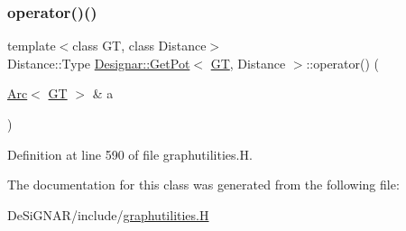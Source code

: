 \subsubsection{\texorpdfstring{operator()()}{operator()()}}
{\footnotesize\ttfamily template$<$class GT, class Distance$>$ \\
Distance\+::\+Type \hyperlink{class_designar_1_1_get_pot}{Designar\+::\+Get\+Pot}$<$ \hyperlink{demo-buildgraph_8_c_a3001c40d2c31ca87ed96cd7d1334a55e}{GT}, Distance $>$\+::operator() (\begin{DoxyParamCaption}\item[{\hyperlink{namespace_designar_a3f55fb5513d62ff47cbc8f72b8e95d6f}{Arc}$<$ \hyperlink{demo-buildgraph_8_c_a3001c40d2c31ca87ed96cd7d1334a55e}{GT} $>$ \&}]{a }\end{DoxyParamCaption})\hspace{0.3cm}{\ttfamily [inline]}}



Definition at line 590 of file graphutilities.\+H.



The documentation for this class was generated from the following file\+:\begin{DoxyCompactItemize}
\item 
De\+Si\+G\+N\+A\+R/include/\hyperlink{graphutilities_8_h}{graphutilities.\+H}\end{DoxyCompactItemize}
